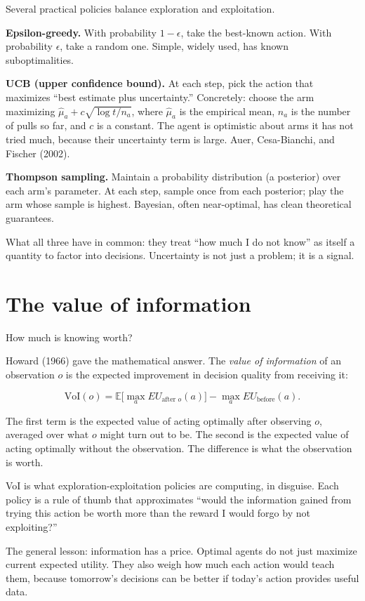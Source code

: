 Several practical policies balance exploration and exploitation.

\textbf{Epsilon-greedy.} With probability $1 - \epsilon$, take the best-known action. With probability $\epsilon$, take a random one. Simple, widely used, has known suboptimalities.

\textbf{UCB (upper confidence bound).} At each step, pick the action that maximizes ``best estimate plus uncertainty.'' Concretely: choose the arm maximizing $\hat{\mu}_a + c\sqrt{\log t / n_a}$, where $\hat{\mu}_a$ is the empirical mean, $n_a$ is the number of pulls so far, and $c$ is a constant. The agent is optimistic about arms it has not tried much, because their uncertainty term is large. Auer, Cesa-Bianchi, and Fischer (2002).

\textbf{Thompson sampling.} Maintain a probability distribution (a posterior) over each arm's parameter. At each step, sample once from each posterior; play the arm whose sample is highest. Bayesian, often near-optimal, has clean theoretical guarantees.

What all three have in common: they treat ``how much I do not know'' as itself a quantity to factor into decisions. Uncertainty is not just a problem; it is a signal.

\section*{The value of information}

How much is knowing worth?

Howard (1966) gave the mathematical answer. The \emph{value of information} of an observation $o$ is the expected improvement in decision quality from receiving it:

$$\mathrm{VoI}(o) = \mathbb{E}\big[\max_a EU_{\text{after }o}(a)\big] - \max_a EU_{\text{before}}(a).$$

The first term is the expected value of acting optimally after observing $o$, averaged over what $o$ might turn out to be. The second is the expected value of acting optimally without the observation. The difference is what the observation is worth.

VoI is what exploration-exploitation policies are computing, in disguise. Each policy is a rule of thumb that approximates ``would the information gained from trying this action be worth more than the reward I would forgo by not exploiting?''

The general lesson: information has a price. Optimal agents do not just maximize current expected utility. They also weigh how much each action would teach them, because tomorrow's decisions can be better if today's action provides useful data.

